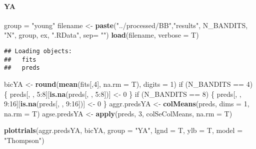 \documentclass[11pt,,]{article}
\newenvironment{Shaded}{\begin{snugshade}}{\end{snugshade}}
\newcommand{\KeywordTok}[1]{\textcolor[rgb]{0.13,0.29,0.53}{\textbf{{#1}}}}
\newcommand{\DataTypeTok}[1]{\textcolor[rgb]{0.13,0.29,0.53}{{#1}}}
\newcommand{\DecValTok}[1]{\textcolor[rgb]{0.00,0.00,0.81}{{#1}}}
\newcommand{\StringTok}[1]{\textcolor[rgb]{0.31,0.60,0.02}{{#1}}}
\newcommand{\NormalTok}[1]{{#1}}
\let\oldparagraph\paragraph
\renewcommand{\paragraph}[1]{\oldparagraph{#1}\mbox{}}
\begin{document}
\paragraph{YA}\label{ya-1}

\begin{Shaded}
\begin{Highlighting}[]
\NormalTok{group =}\StringTok{ "young"}
\NormalTok{filename  <-}\StringTok{ }\KeywordTok{paste}\NormalTok{(}\StringTok{"../processed/BB"}\NormalTok{,}\StringTok{"results"}\NormalTok{, N_BANDITS, }\StringTok{"N"}\NormalTok{, }
                   \NormalTok{group, ex, }\StringTok{".RData"}\NormalTok{, }\DataTypeTok{sep=} \StringTok{""}\NormalTok{)}
\KeywordTok{load}\NormalTok{(filename, }\DataTypeTok{verbose =} \NormalTok{T)}
\end{Highlighting}
\end{Shaded}

\begin{verbatim}
## Loading objects:
##   fits
##   preds
\end{verbatim}

\begin{Shaded}
\begin{Highlighting}[]
\NormalTok{bicYA <-}\StringTok{ }\KeywordTok{round}\NormalTok{(}\KeywordTok{mean}\NormalTok{(fits[,}\DecValTok{4}\NormalTok{], }\DataTypeTok{na.rm =} \NormalTok{T), }\DataTypeTok{digits =} \DecValTok{1}\NormalTok{)}
\NormalTok{if (N_BANDITS ==}\StringTok{ }\DecValTok{4}\NormalTok{) \{}
    \NormalTok{preds[, , }\DecValTok{5}\NormalTok{:}\DecValTok{8}\NormalTok{][}\KeywordTok{is.na}\NormalTok{(preds[, , }\DecValTok{5}\NormalTok{:}\DecValTok{8}\NormalTok{])] <-}\StringTok{ }\DecValTok{0}
\NormalTok{\}}
\NormalTok{if (N_BANDITS ==}\StringTok{ }\DecValTok{8}\NormalTok{) \{}
    \NormalTok{preds[, , }\DecValTok{9}\NormalTok{:}\DecValTok{16}\NormalTok{][}\KeywordTok{is.na}\NormalTok{(preds[, , }\DecValTok{9}\NormalTok{:}\DecValTok{16}\NormalTok{])] <-}\StringTok{ }\DecValTok{0}
\NormalTok{\}}
\NormalTok{aggr.predsYA <-}\StringTok{ }\KeywordTok{colMeans}\NormalTok{(preds, }\DataTypeTok{dims =} \DecValTok{1}\NormalTok{, }\DataTypeTok{na.rm =} \NormalTok{T) }
\NormalTok{agse.predsYA <-}\StringTok{ }\KeywordTok{apply}\NormalTok{(preds, }\DecValTok{3}\NormalTok{, colSeColMeans, }\DataTypeTok{na.rm =} \NormalTok{T) }
\end{Highlighting}
\end{Shaded}

\begin{Shaded}
\begin{Highlighting}[]
\KeywordTok{plottrials}\NormalTok{(aggr.predsYA, bicYA, }\DataTypeTok{group =} \StringTok{"YA"}\NormalTok{, }\DataTypeTok{lgnd =} \NormalTok{T, }\DataTypeTok{ylb =} \NormalTok{T, }\DataTypeTok{model =} \StringTok{"Thompson"}\NormalTok{)}
\end{Highlighting}
\end{Shaded}
\end{document}
